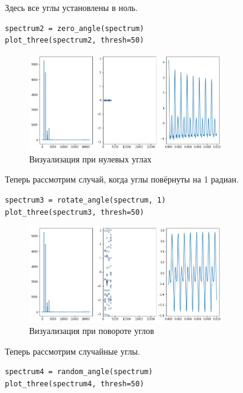 \documentclass[a4paper,12pt]{report}
\begin{document}
Здесь все углы установлены в ноль.

\begin{lstlisting}[caption=Визуализация при нулевых углах]
spectrum2 = zero_angle(spectrum)
plot_three(spectrum2, thresh=50)
\end{lstlisting}

\begin{figure}[H]
        \centering
        \includegraphics[width=0.75\textwidth]{lab6_fig3_10.png}
        \caption{Визуализация при нулевых углах}
        \label{fig:lab6_fig3_10}
\end{figure}

Теперь рассмотрим случай, когда углы повёрнуты на 1 радиан.

\begin{lstlisting}[caption=Визуализация при повороте углов]
spectrum3 = rotate_angle(spectrum, 1)
plot_three(spectrum3, thresh=50)
\end{lstlisting}

\begin{figure}[H]
        \centering
        \includegraphics[width=0.75\textwidth]{lab6_fig3_11.png}
        \caption{Визуализация при повороте углов}
        \label{fig:lab6_fig3_11}
\end{figure}

Теперь рассмотрим случайные углы.

\begin{lstlisting}[caption=Визуализация при случайных углах]
spectrum4 = random_angle(spectrum)
plot_three(spectrum4, thresh=50)
\end{lstlisting}
\end{document}
